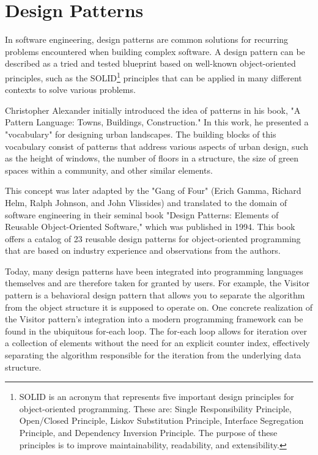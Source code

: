 \section{Design Patterns}
    In software engineering, design patterns are common solutions for recurring problems encountered when building complex software. A design pattern can be described as a tried and tested blueprint based on well-known object-oriented principles, such as the SOLID\footnote{SOLID is an acronym that represents five important design principles for object-oriented programming. These are: Single Responsibility Principle, Open/Closed Principle, Liskov Substitution Principle, Interface Segregation Principle, and Dependency Inversion Principle. The purpose of these principles is to improve maintainability, readability, and extensibility.} principles that can be applied in many different contexts to solve various problems.

    Christopher Alexander initially introduced the idea of patterns in his book, "A Pattern Language: Towns, Buildings, Construction." In this work, he presented a "vocabulary" for designing urban landscapes. The building blocks of this vocabulary consist of patterns that address various aspects of urban design, such as the height of windows, the number of floors in a structure, the size of green spaces within a community, and other similar elements.

    This concept was later adapted by the "Gang of Four" (Erich Gamma, Richard Helm, Ralph Johnson, and John Vlissides) and translated to the domain of software engineering in their seminal book "Design Patterns: Elements of Reusable Object-Oriented Software," which was published in 1994. This book offers a catalog of 23 reusable design patterns for object-oriented programming that are based on industry experience and observations from the authors.

    Today, many design patterns have been integrated into programming languages themselves and are therefore taken for granted by users. For example, the Visitor pattern is a behavioral design pattern that allows you to separate the algorithm from the object structure it is supposed to operate on. One concrete realization of the Visitor pattern's integration into a modern programming framework can be found in the ubiquitous for-each loop. The for-each loop allows for iteration over a collection of elements without the need for an explicit counter index, effectively separating the algorithm responsible for the iteration from the underlying data structure.

